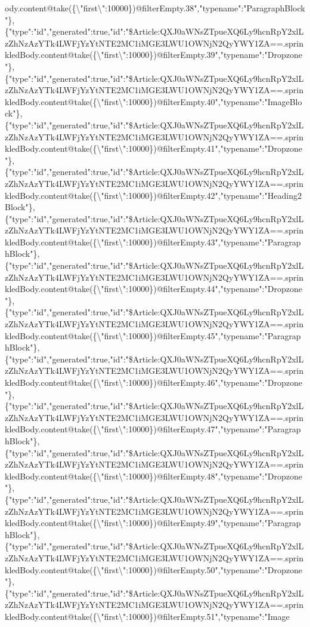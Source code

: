 ody.content@take(\{\textbackslash{}"first\textbackslash{}":10000\})@filterEmpty.38","typename":"ParagraphBlock"\},\{"type":"id","generated":true,"id":"\$Article:QXJ0aWNsZTpueXQ6Ly9hcnRpY2xlLzZhNzAzYTk4LWFjYzYtNTE2MC1iMGE3LWU1OWNjN2QyYWY1ZA==.sprinkledBody.content@take(\{\textbackslash{}"first\textbackslash{}":10000\})@filterEmpty.39","typename":"Dropzone"\},\{"type":"id","generated":true,"id":"\$Article:QXJ0aWNsZTpueXQ6Ly9hcnRpY2xlLzZhNzAzYTk4LWFjYzYtNTE2MC1iMGE3LWU1OWNjN2QyYWY1ZA==.sprinkledBody.content@take(\{\textbackslash{}"first\textbackslash{}":10000\})@filterEmpty.40","typename":"ImageBlock"\},\{"type":"id","generated":true,"id":"\$Article:QXJ0aWNsZTpueXQ6Ly9hcnRpY2xlLzZhNzAzYTk4LWFjYzYtNTE2MC1iMGE3LWU1OWNjN2QyYWY1ZA==.sprinkledBody.content@take(\{\textbackslash{}"first\textbackslash{}":10000\})@filterEmpty.41","typename":"Dropzone"\},\{"type":"id","generated":true,"id":"\$Article:QXJ0aWNsZTpueXQ6Ly9hcnRpY2xlLzZhNzAzYTk4LWFjYzYtNTE2MC1iMGE3LWU1OWNjN2QyYWY1ZA==.sprinkledBody.content@take(\{\textbackslash{}"first\textbackslash{}":10000\})@filterEmpty.42","typename":"Heading2Block"\},\{"type":"id","generated":true,"id":"\$Article:QXJ0aWNsZTpueXQ6Ly9hcnRpY2xlLzZhNzAzYTk4LWFjYzYtNTE2MC1iMGE3LWU1OWNjN2QyYWY1ZA==.sprinkledBody.content@take(\{\textbackslash{}"first\textbackslash{}":10000\})@filterEmpty.43","typename":"ParagraphBlock"\},\{"type":"id","generated":true,"id":"\$Article:QXJ0aWNsZTpueXQ6Ly9hcnRpY2xlLzZhNzAzYTk4LWFjYzYtNTE2MC1iMGE3LWU1OWNjN2QyYWY1ZA==.sprinkledBody.content@take(\{\textbackslash{}"first\textbackslash{}":10000\})@filterEmpty.44","typename":"Dropzone"\},\{"type":"id","generated":true,"id":"\$Article:QXJ0aWNsZTpueXQ6Ly9hcnRpY2xlLzZhNzAzYTk4LWFjYzYtNTE2MC1iMGE3LWU1OWNjN2QyYWY1ZA==.sprinkledBody.content@take(\{\textbackslash{}"first\textbackslash{}":10000\})@filterEmpty.45","typename":"ParagraphBlock"\},\{"type":"id","generated":true,"id":"\$Article:QXJ0aWNsZTpueXQ6Ly9hcnRpY2xlLzZhNzAzYTk4LWFjYzYtNTE2MC1iMGE3LWU1OWNjN2QyYWY1ZA==.sprinkledBody.content@take(\{\textbackslash{}"first\textbackslash{}":10000\})@filterEmpty.46","typename":"Dropzone"\},\{"type":"id","generated":true,"id":"\$Article:QXJ0aWNsZTpueXQ6Ly9hcnRpY2xlLzZhNzAzYTk4LWFjYzYtNTE2MC1iMGE3LWU1OWNjN2QyYWY1ZA==.sprinkledBody.content@take(\{\textbackslash{}"first\textbackslash{}":10000\})@filterEmpty.47","typename":"ParagraphBlock"\},\{"type":"id","generated":true,"id":"\$Article:QXJ0aWNsZTpueXQ6Ly9hcnRpY2xlLzZhNzAzYTk4LWFjYzYtNTE2MC1iMGE3LWU1OWNjN2QyYWY1ZA==.sprinkledBody.content@take(\{\textbackslash{}"first\textbackslash{}":10000\})@filterEmpty.48","typename":"Dropzone"\},\{"type":"id","generated":true,"id":"\$Article:QXJ0aWNsZTpueXQ6Ly9hcnRpY2xlLzZhNzAzYTk4LWFjYzYtNTE2MC1iMGE3LWU1OWNjN2QyYWY1ZA==.sprinkledBody.content@take(\{\textbackslash{}"first\textbackslash{}":10000\})@filterEmpty.49","typename":"ParagraphBlock"\},\{"type":"id","generated":true,"id":"\$Article:QXJ0aWNsZTpueXQ6Ly9hcnRpY2xlLzZhNzAzYTk4LWFjYzYtNTE2MC1iMGE3LWU1OWNjN2QyYWY1ZA==.sprinkledBody.content@take(\{\textbackslash{}"first\textbackslash{}":10000\})@filterEmpty.50","typename":"Dropzone"\},\{"type":"id","generated":true,"id":"\$Article:QXJ0aWNsZTpueXQ6Ly9hcnRpY2xlLzZhNzAzYTk4LWFjYzYtNTE2MC1iMGE3LWU1OWNjN2QyYWY1ZA==.sprinkledBody.content@take(\{\textbackslash{}"first\textbackslash{}":10000\})@filterEmpty.51","typename":"Image